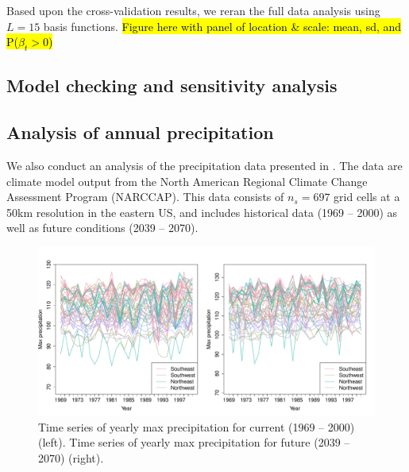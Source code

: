 \documentclass[11pt]{article}
\begin{document}


Based upon the cross-validation results, we reran the full data analysis using $L = 15$ basis functions.
\hl{Figure here with panel of location \& scale: mean, sd, and P($\beta_t > 0$)}


\subsection{Model checking and sensitivity analysis}

\subsection{Analysis of annual precipitation}\label{s:precip}
We also conduct an analysis of the precipitation data presented in \citep{Reich2012}.
The data are climate model output from the North American Regional Climate Change Assessment Program (NARCCAP).
This data consists of $n_s = 697$ grid cells at a 50km resolution in the eastern US, and includes historical data (1969 -- 2000) as well as future conditions (2039 -- 2070).

\begin{figure}  %
  \centering
  \includegraphics[width=\linewidth]{plots/precip-ts}
  \caption{Time series of yearly max precipitation for current (1969 -- 2000) (left). Time series of yearly max precipitation for future (2039 -- 2070) (right).}
\end{figure}
\end{document}
